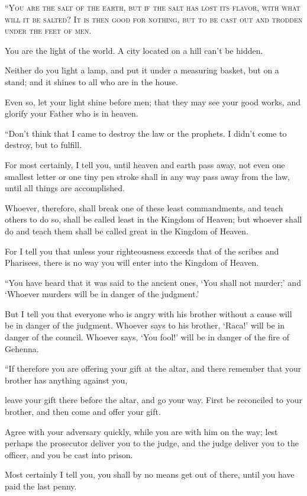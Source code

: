 \lettrine{“}{You are the salt of the earth, but if the salt has lost its flavor, with what will it be salted? It is then good for nothing, but to be cast out and trodden under the feet of men.}

You are the light of the world. A city located on a hill can’t be hidden.

Neither do you light a lamp, and put it under a measuring basket, but on a stand; and it shines to all who are in the house.

Even so, let your light shine before men; that they may see your good works, and glorify your Father who is in heaven.

“Don’t think that I came to destroy the law or the prophets. I didn’t come to destroy, but to fulfill.

For most certainly, I tell you, until heaven and earth pass away, not even one smallest letter or one tiny pen stroke shall in any way pass away from the law, until all things are accomplished.

Whoever, therefore, shall break one of these least commandments, and teach others to do so, shall be called least in the Kingdom of Heaven; but whoever shall do and teach them shall be called great in the Kingdom of Heaven.

For I tell you that unless your righteousness exceeds that of the scribes and Pharisees, there is no way you will enter into the Kingdom of Heaven.

“You have heard that it was said to the ancient ones, ‘You shall not murder;’ and ‘Whoever murders will be in danger of the judgment.’

But I tell you that everyone who is angry with his brother without a cause   will be in danger of the judgment. Whoever says to his brother, ‘Raca!’  will be in danger of the council. Whoever says, ‘You fool!’ will be in danger of the fire of Gehenna.

“If therefore you are offering your gift at the altar, and there remember that your brother has anything against you,

leave your gift there before the altar, and go your way. First be reconciled to your brother, and then come and offer your gift.

Agree with your adversary quickly, while you are with him on the way; lest perhaps the prosecutor deliver you to the judge, and the judge deliver you to the officer, and you be cast into prison.

Most certainly I tell you, you shall by no means get out of there, until you have paid the last penny.

